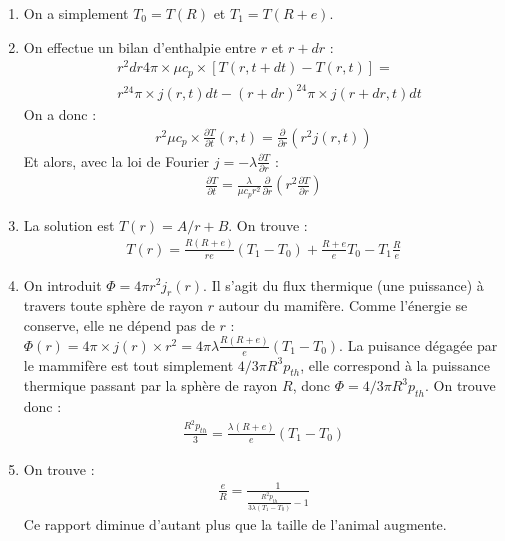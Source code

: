 \begin{correction}

\begin{enumerate}

	\item On a simplement $T_{0}=T(R)$ et $T_1=T(R+e)$.
	
	\item On effectue un bilan d'enthalpie entre $r$ et $r+dr$ :
	\begin{align*}
		& r^2dr4\pi\times \mu c_p\times[T(r,t+dt)-T(r,t)]= \\
		& r^24\pi\times j(r,t)dt-(r+dr)^24\pi\times j(r+dr,t)dt
	\end{align*}
	On a donc :
	\begin{align*}
		 r^2 \mu c_p\times\frac{\partial T}{\partial t}(r,t)= \frac{\partial}{\partial r} \left( r^2j(r,t)\right)
	\end{align*}	
	Et alors, avec la loi de Fourier $j=-\lambda\frac{\partial T}{\partial r}$ :
	\begin{align*}
		\frac{\partial T}{\partial t}=\frac{\lambda}{\mu c_pr^2}\frac{\partial }{\partial r}\left( r^2\frac{\partial T}{\partial r}\right)
	\end{align*}

	\item La solution est $T(r)=A/r+B$. On trouve :
	\begin{align*}
		T(r) = \frac{R(R+e)}{re}(T_1-T_0)+\frac{R+e}{e}T_0-T_1\frac{R}{e}
	\end{align*}
	
	\item On introduit $\Phi=4\pi r^2j_r(r)$. Il s'agit du flux thermique (une puissance) à travers toute sphère de rayon $r$ autour du mamifère. Comme l'énergie se conserve, elle ne dépend pas de $r$ : $\Phi(r) =4\pi\times j(r)\times r^2=4\pi \lambda\frac{R(R+e)}{e}(T_1-T_0)$. La puisance dégagée par le mammifère est tout simplement $4/3\pi R^3p_{th}$, elle correspond à la puissance thermique passant par la sphère de rayon $R$, donc $\Phi =4/3\pi R^3p_{th}$. On trouve donc :
	\begin{align*}
		\frac{R^2p_{th}}{3}=\frac{\lambda (R+e)}{e}(T_1-T_0)
	\end{align*}
	
	\item On trouve :
	\begin{align*}
		\frac{e}{R}=\frac{1}{\frac{R^2p_{th}}{3\lambda(T_1-T_0)}-1}
	\end{align*}
	Ce rapport diminue d'autant plus que la taille de l'animal augmente.

\end{enumerate}

\end{correction}

